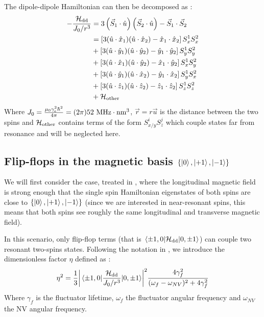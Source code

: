 \documentclass[preprintnumbers,amsmath,amssymb,onecolumn,12pt]{revtex4-2}
\begin{document}
The dipole-dipole Hamiltonian can then be decomposed as :
\begin{align}
-\frac{\mathcal{H}_{\rm dd}}{J_0/r^3}&= 3\left({\vec S}_1 \cdot \hat{u} \right)\left({\vec S}_2 \cdot \hat{u} \right) - {\vec S}_1 \cdot {\vec S}_2  \\
&=\left[3(\hat{u}\cdot\hat{x}_1)(\hat{u}\cdot\hat{x}_2) -\hat{x}_1\cdot\hat{x}_2\right] S_x^1S_x^2 \\
&+\left[3(\hat{u}\cdot\hat{y}_1)(\hat{u}\cdot\hat{y}_2) -\hat{y}_1\cdot\hat{y}_2\right] S_y^1S_y^2 \\
&+\left[3(\hat{u}\cdot\hat{x}_1)(\hat{u}\cdot\hat{y}_2) -\hat{x}_1\cdot\hat{y}_2\right] S_x^1S_y^2 \\
&+\left[3(\hat{u}\cdot\hat{y}_1)(\hat{u}\cdot\hat{x}_2) -\hat{y}_1\cdot\hat{x}_2\right] S_y^1S_x^2 \\
&+\left[3(\hat{u}\cdot\hat{z}_1)(\hat{u}\cdot\hat{z}_2) -\hat{z}_1\cdot\hat{z}_2\right] S_z^1S_z^2 \\
&+\mathcal{H}_{\rm other}
\end{align}
Where $J_0=\frac{\mu_0 \gamma_e^2 \hbar^2}{4 \pi} = (2 \pi) 52\ \rm MHz \cdot \rm{nm}^3$, $\vec r= r\vec u$ is the distance between the two spins and  $\mathcal{H}_{\rm other}$ contains terms of the form $S_{x/y}^iS_z^j$ which couple states far from resonance and will be neglected here.

\subsection{Flip-flops in the magnetic basis $\{ \ket{0},\ket{+1},\ket{-1} \} $}
We will first consider the case, treated in \cite{choi_depolarization_2017}, where the longitudinal magnetic field is strong enough that the single spin Hamiltonian eigenstates of both spins are close to $\{ \ket{0},\ket{+1},\ket{-1} \} $ (since we are interested in near-resonant spins, this means that both spins see roughly the same longitudinal and transverse magnetic field).

In this scenario, only flip-flop terms (that is $\mel{\pm 1,0}{\mathcal{H}_{\rm dd}}{0,\pm 1}$) can couple two resonant two-spins states. Following the notation in \cite{choi_depolarization_2017}, we introduce the dimensionless factor $\eta$ defined as : 
\begin{equation}
\eta^2=\frac{1}{3} \abs{\mel{\pm 1,0}{\frac{\mathcal{H}_{\rm dd}}{J_0/r^3}}{0,\pm 1}}^2  \frac{4\gamma_f^2}{(\omega_f - \omega_{NV})^2+4\gamma_f^2}
\end{equation}
Where $\gamma_f$ is the fluctuator lifetime, $\omega_f$ the fluctuator angular frequency and $\omega_{NV}$ the NV angular frequency. %
\end{document}
